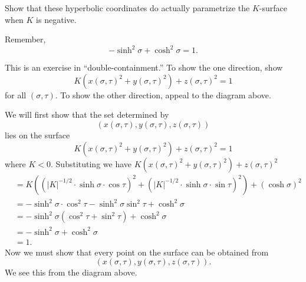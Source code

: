 \documentclass[handout,newpage,hints,,12pt,noauthor,nooutcomes]{ximera}
\begin{document}
\begin{problem}
Show that these hyperbolic coordinates do actually parametrize the
$K$-surface when $K$ is negative.
\begin{hint}
  Remember,
  \[
  -\sinh^2\sigma + \cosh^2\sigma =1.
  \]
\end{hint}
\begin{hint}
  This is an exercise in ``double-containment.'' To show the one
  direction, show
\[
K\left(x(\sigma,\tau)^{2}+y(\sigma,\tau)^{2}\right)+z(\sigma,\tau)^{2}=1
\]
for all $(\sigma,\tau)$. To show the other direction, appeal to the
diagram above.
\end{hint}
\begin{freeResponse}
  We will first show that the set determined by
  \[
  \left(x(\sigma,\tau), y(\sigma,\tau), z(\sigma,\tau)\right)
  \]
  lies on the surface
  \[
  K\left(x(\sigma,\tau) ^{2}+y(\sigma,\tau) ^{2}\right) +z(\sigma,\tau)^{2} = 1
  \]
  where $K<0$. Substituting we have
  $K\left(x(\sigma,\tau) ^{2}+y(\sigma,\tau) ^{2}\right)
  +z(\sigma,\tau)^{2}$
  \begin{align*}
    &=K\left((|K|^{-1/2}\cdot\sinh\sigma\cdot\cos\tau)^{2}+(|K|^{-1/2}\cdot\sinh\sigma\cdot\sin\tau)^{2}\right) +(\cosh\sigma)^{2} \\
    &= -\sinh^2\sigma\cdot\cos^2\tau-\sinh^2\sigma\sin^2\tau + \cosh^2\sigma \\
    &= -\sinh^2\sigma(\cos^2\tau+\sin^2\tau) + \cosh^2\sigma \\
    &= -\sinh^2\sigma + \cosh^2\sigma \\
    &=1.
  \end{align*}
  Now we must show that every point on the surface can be obtained from
  \[
  \left(x(\sigma,\tau), y(\sigma,\tau), z(\sigma,\tau)\right).
  \]
  We see this from the diagram above. 
\end{freeResponse}
\end{problem}
\end{document}
